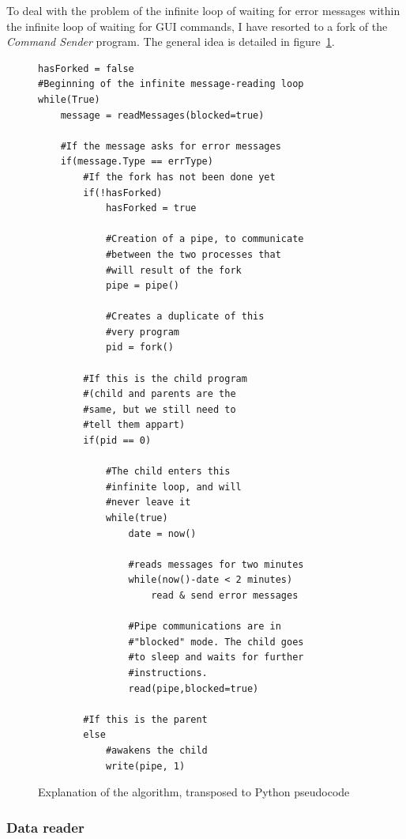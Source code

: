 \documentclass{themeensg}
\begin{document}
To deal with the problem of the infinite loop of waiting for error messages within the infinite loop of waiting for GUI commands, I have resorted to a fork of the \textit{Command Sender} program. The general idea is detailed in figure~\ref{fig:pseudocode}.\\


\begin{figure}[hb]
	\centering
 
	\begin{lstlisting}[frame=single]
hasForked = false
#Beginning of the infinite message-reading loop
while(True)	
	message = readMessages(blocked=true)
	
	#If the message asks for error messages
	if(message.Type == errType)
		#If the fork has not been done yet
		if(!hasForked)	
			hasForked = true
			
			#Creation of a pipe, to communicate
			#between the two processes that
			#will result of the fork
			pipe = pipe()
			
			#Creates a duplicate of this
			#very program
			pid = fork()
			
		#If this is the child program
		#(child and parents are the 
		#same, but we still need to
		#tell them appart)
		if(pid == 0)
		
			#The child enters this
			#infinite loop, and will
			#never leave it
			while(true)
				date = now()
				
				#reads messages for two minutes
				while(now()-date < 2 minutes)
					read & send error messages
					
				#Pipe communications are in 
				#"blocked" mode. The child goes
				#to sleep and waits for further
				#instructions.
				read(pipe,blocked=true)
				
		#If this is the parent
		else
			#awakens the child
			write(pipe, 1)				
	\end{lstlisting}
	\caption{Explanation of the algorithm, transposed to Python pseudocode}
	\label{fig:pseudocode}
\end{figure}

\subsubsection{Data reader}
\end{document}
